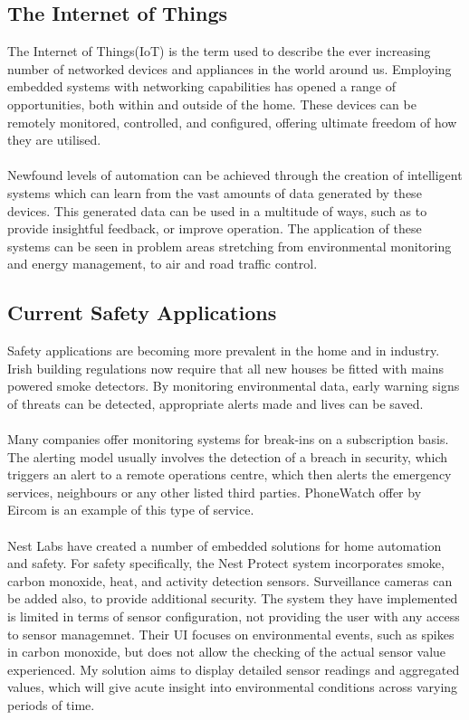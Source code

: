 \documentclass{article}
\begin{document}
\subsection{The Internet of Things}
The Internet of Things(IoT) is the term used to describe the ever increasing number of networked devices and appliances in the world around us. Employing embedded systems with networking capabilities has opened a range of opportunities, both within and outside of the home. These devices can be remotely monitored, controlled, and configured, offering ultimate freedom of how they are utilised. \\\\
Newfound levels of automation can be achieved through the creation of intelligent systems which can learn from the vast amounts of data generated by these devices. This generated data can be used in a multitude of ways, such as to provide insightful feedback, or improve operation. The application of these systems can be seen in problem areas stretching from environmental monitoring and energy management, to air and road traffic control. 

\subsection{Current Safety Applications}
Safety applications are becoming more prevalent in the home and in industry. Irish building regulations now require that all new houses be fitted with mains powered smoke detectors. By monitoring environmental data, early warning signs of threats can be detected, appropriate alerts made and lives can be saved.\\\\
Many companies offer monitoring systems for break-ins on a subscription basis. The alerting model usually involves the detection of a breach in security, which triggers an alert to a remote operations centre, which then alerts the emergency services, neighbours or any other listed third parties. PhoneWatch offer by Eircom is an example of this type of service. \\\\
Nest Labs have created a number of embedded solutions for home automation and safety. For safety specifically, the Nest Protect system incorporates smoke, carbon monoxide, heat, and activity detection sensors. Surveillance cameras can be added also, to provide additional security. The system they have implemented is limited in terms of sensor configuration, not providing the user with any access to sensor managemnet. Their UI focuses on environmental events, such as spikes in carbon monoxide, but does not allow the checking of the actual sensor value experienced. My solution aims to display detailed sensor readings and aggregated values, which will give acute insight into environmental conditions across varying periods of time. 
\end{document}
